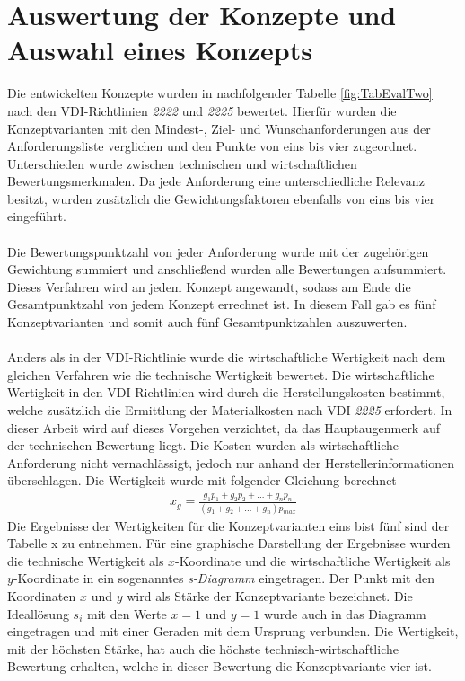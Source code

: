 \section{Auswertung der Konzepte und Auswahl eines Konzepts}
Die entwickelten Konzepte wurden in nachfolgender Tabelle \ref{fig:TabEvalTwo} nach den VDI-Richtlinien \textit{2222} und \textit{2225} bewertet. Hierf\"{u}r wurden die Konzeptvarianten mit den Mindest-, Ziel- und Wunschanforderungen aus der Anforderungsliste verglichen und den Punkte von eins bis vier zugeordnet. Unterschieden wurde zwischen technischen und wirtschaftlichen Bewertungsmerkmalen. Da jede Anforderung eine unterschiedliche Relevanz besitzt, wurden zus\"{a}tzlich die Gewichtungsfaktoren ebenfalls von eins bis vier eingef\"{u}hrt.
\\\\
Die Bewertungspunktzahl von jeder Anforderung wurde mit der zugeh\"{o}rigen Gewichtung summiert und anschlie{\ss}end wurden alle Bewertungen aufsummiert. Dieses Verfahren wird an jedem Konzept angewandt, sodass am Ende die Gesamtpunktzahl von jedem Konzept errechnet ist. In diesem Fall gab es f\"{u}nf Konzeptvarianten und somit auch f\"{u}nf Gesamtpunktzahlen auszuwerten.
\\\\
Anders als in der VDI-Richtlinie wurde die wirtschaftliche Wertigkeit nach dem gleichen Verfahren wie die technische Wertigkeit bewertet. Die wirtschaftliche Wertigkeit in den VDI-Richtlinien wird durch die Herstellungskosten bestimmt, welche zus\"{a}tzlich die Ermittlung der Materialkosten nach VDI \textit{2225} erfordert. In dieser Arbeit wird auf dieses Vorgehen verzichtet, da das Hauptaugenmerk auf der technischen Bewertung liegt. Die Kosten wurden als wirtschaftliche Anforderung nicht vernachl\"{a}ssigt, jedoch nur anhand der Herstellerinformationen \"{u}berschlagen. Die Wertigkeit wurde mit folgender Gleichung berechnet
\begin{align*}
	x_g = \frac{g_1p_1 + g_2p_2 + ... + g_np_n}{(g_1 + g_2 + ... + g_n)p_\textit{max}}
\end{align*}
Die Ergebnisse der Wertigkeiten f\"{u}r die Konzeptvarianten eins bist f\"{u}nf sind der Tabelle x zu entnehmen. F\"{u}r eine graphische Darstellung der Ergebnisse wurden die technische Wertigkeit als \(x\)-Koordinate und die wirtschaftliche Wertigkeit als \(y\)-Koordinate in ein sogenanntes \textit{s-Diagramm} eingetragen. Der Punkt mit den Koordinaten \(x\) und \(y\) wird als St\"{a}rke der Konzeptvariante bezeichnet. Die Ideall\"{o}sung \(s_i\) mit den Werte \(x = 1\) und \(y = 1\) wurde auch in das Diagramm eingetragen und mit einer Geraden mit dem Ursprung verbunden. Die Wertigkeit, mit der h\"{o}chsten St\"{a}rke, hat auch die h\"{o}chste technisch-wirtschaftliche Bewertung erhalten, welche in dieser Bewertung die Konzeptvariante vier ist.
